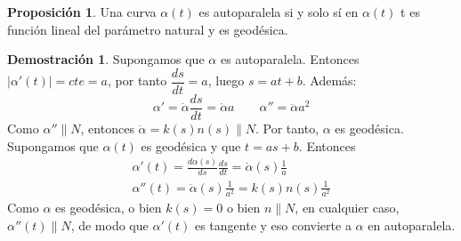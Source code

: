 \documentclass[twoside]{report}
\theoremstyle{definition}
\newtheorem{prop}[theorem]{Proposición}
\newtheorem*{dem}{Demostración}
\numberwithin{equation}{section}
\begin{document}
\begin{prop}
Una curva $\alpha(t)$ es autoparalela si y solo sí en $\alpha(t)$ t es función lineal del parámetro natural y es geodésica.
\end{prop}
\begin{dem}
Supongamos que $\alpha$ es autoparalela. Entonces $|\alpha'(t)| = cte = a$, por tanto $\dfrac{ds}{dt}=a$, luego $s = at + b$. Además:
\[
\alpha' = \dot{\alpha} \frac{ds}{dt} =\dot{\alpha}a \qquad
 \alpha''  = \ddot{\alpha}a^2
 \]
Como $\alpha'' \parallel N$, entonces $\ddot{\alpha}=k(s)n(s)\parallel N$. Por tanto, $\alpha$ es geodésica.\\
Supongamos que $\alpha(t)$ es geodésica y que $t=as+b$. Entonces
\begin{gather*}
\alpha'(t)=\frac{d\alpha(s)}{ds}\frac{ds}{dt}=\dot{\alpha}(s)\frac{1}{a}\\
\alpha''(t)=\ddot{\alpha}(s)\frac{1}{a^2}=k(s)n(s)\frac{1}{a^2}
\end{gather*}
Como $\alpha$ es geodésica, o bien $k(s)=0$ o bien $n\parallel N$, en cualquier caso, $\alpha''(t)\parallel N$, de modo que $\alpha'(t)$ es tangente y eso convierte a $\alpha$ en autoparalela.
\end{dem}
\end{document}
